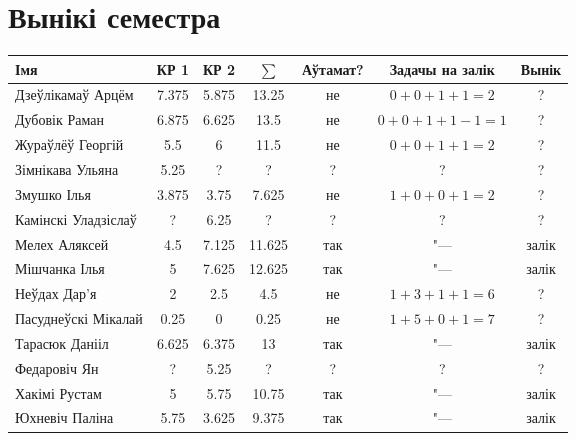 


    \section{Вынікі семестра}
    \begin{table}[H]
        \begin{minipage}{\textwidth}
            \begin{tabular}{|l|c|c|c|c|c|c|}
                \hline
                Імя                 &    КР 1    &    КР 2   & $\sum$ &  Аўтамат?  &  Задачы на залік  &    Вынік  \\ \hline
                Дзеўлікамаў Арцём   &   7.375   &  5.875   &   13.25   &   не   & $0+0+1+1=2$  & ? \\ \hline
                Дубовік Раман       &   6.875   &   6.625   &   13.5   &   не   & $0+0+1+1-1=1$ & ? \\ \hline
                Жураўлёў Георгій    &   5.5  &   6   &   11.5  &   не   & $0+0+1+1=2$ & ? \\ \hline
                Зімнікава Ульяна    &   5.25   &   ?   &   ?   &   ?   & ? & ? \\ \hline
                Змушко Ілья         & 3.875 &   3.75  &   7.625  &   не   & $1+0+0+1=2$ & ? \\ \hline
                Камінскі Уладзіслаў &   ?      &    6.25     &   ?      &  ?  & ? & ? \\ \hline
                Мелех Аляксей       &   4.5   &   7.125   &   11.625   &   так   & "--- & залік \\ \hline
                Мішчанка Ілья       &   5   &  7.625 &   12.625   & так & "--- & залік \\ \hline
                Неўдах Дар'я        &   2   &   2.5   &   4.5   & не & $1+3+1+1=6$ & ? \\ \hline
                Пасуднеўскі Мікалай &    0.25     &  0     &   0.25      &   не & $1+5+0+1=7$  & ? \\ \hline
                Тарасюк Данііл      & 6.625 &   6.375   & 13 &   так   & "--- & залік \\ \hline
                Федаровіч Ян        &   ?   & 5.25 &   ?   &   ?   & ? & ? \\ \hline
                Хакімі Рустам       &   5   & 5.75 &   10.75   &  так   & "--- & залік \\ \hline
                Юхневіч Паліна      & 5.75 & 3.625 &   9.375   &  так & "--- & залік \\ \hline
            \end{tabular}
        \end{minipage}
    \end{table}

